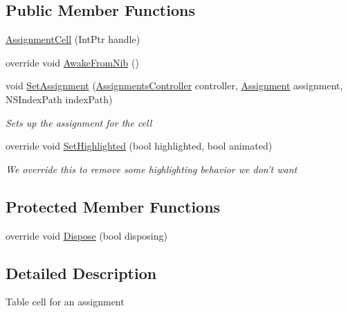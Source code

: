 \subsection*{Public Member Functions}
\begin{DoxyCompactItemize}
\item 
\hyperlink{class_field_service_1_1i_o_s_1_1_assignment_cell_a172b00debbabf1d92023f950d5a49380}{Assignment\+Cell} (Int\+Ptr handle)
\item 
override void \hyperlink{class_field_service_1_1i_o_s_1_1_assignment_cell_a8178a058a3d553684d6d775a8606e809}{Awake\+From\+Nib} ()
\item 
void \hyperlink{class_field_service_1_1i_o_s_1_1_assignment_cell_aefb7c10b1d9aa895d917f27ab9bb7ad7}{Set\+Assignment} (\hyperlink{class_field_service_1_1i_o_s_1_1_assignments_controller}{Assignments\+Controller} controller, \hyperlink{class_field_service_1_1_data_1_1_assignment}{Assignment} assignment, N\+S\+Index\+Path index\+Path)
\begin{DoxyCompactList}\small\item\em Sets up the assignment for the cell \end{DoxyCompactList}\item 
override void \hyperlink{class_field_service_1_1i_o_s_1_1_assignment_cell_a626e21629b5ed224f0a991840f43cdd5}{Set\+Highlighted} (bool highlighted, bool animated)
\begin{DoxyCompactList}\small\item\em We override this to remove some highlighting behavior we don't want \end{DoxyCompactList}\end{DoxyCompactItemize}
\subsection*{Protected Member Functions}
\begin{DoxyCompactItemize}
\item 
override void \hyperlink{class_field_service_1_1i_o_s_1_1_assignment_cell_a22fce82572e2e3ed9c5fa160e35dcd3c}{Dispose} (bool disposing)
\end{DoxyCompactItemize}


\subsection{Detailed Description}
Table cell for an assignment 



